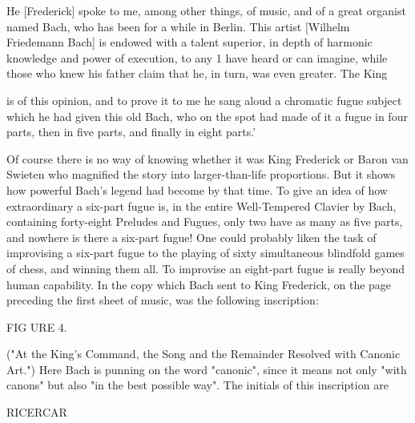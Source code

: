 He [Frederick] spoke to me, among other things, of music, and of a great organist named Bach, who has been for a while in Berlin. This artist [Wilhelm Friedemann Bach] is endowed with a talent superior, in depth of harmonic knowledge and power of execution, to any 1 have heard or can imagine, while those who knew his father claim that he, in turn, was even greater. The King 





is of this opinion, and to prove it to me he sang aloud a chromatic fugue subject which he had given this old Bach, who on the spot had made of it a fugue in four parts, then in five parts, and finally in eight parts.' 

Of course there is no way of knowing whether it was King Frederick or Baron van Swieten who magnified the story into larger-than-life proportions. But it shows how powerful Bach's legend had become by that time. To give an idea of how extraordinary a six-part fugue is, in the entire Well-Tempered Clavier by Bach, containing forty-eight Preludes and Fugues, only two have as many as five parts, and nowhere is there a six-part fugue! One could probably liken the task of improvising a six-part fugue to the playing of sixty simultaneous blindfold games of chess, and winning them all. To improvise an eight-part fugue is really beyond human capability. In the copy which Bach sent to King Frederick, on the page preceding the first sheet of music, was the following inscription: 







FIG URE 4. 


\intro ("At the King's Command, the Song and the Remainder Resolved with Canonic Art.") \endintro
Here Bach is punning on the word "canonic", since it means not only "with canons" but also "in the best possible way". The initials of this inscription are 

RICERCAR 


